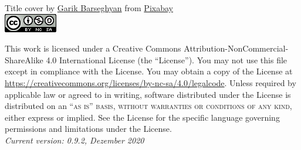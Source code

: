\noindent Title cover by \href{https://pixabay.com/users/insspirito-1851261/?utm_source=link-attribution&amp;utm_medium=referral&amp;utm_campaign=image&amp;utm_content=1280089}{Garik Barseghyan} from \href{https://pixabay.com/?utm_source=link-attribution&amp;utm_medium=referral&amp;utm_campaign=image&amp;utm_content=1280089}{Pixabay}\\

\includegraphics[]{figures/index/license.png}

\noindent This work is licensed under a Creative Commons Attribution-NonCommercial-ShareAlike 4.0 International License (the ``License''). You may not use this file except in compliance with the License. You may obtain a copy of the License at \url{https://creativecommons.org/licenses/by-nc-sa/4.0/legalcode}. Unless required by applicable law or agreed to in writing, software distributed under the License is distributed on an \textsc{``as is'' basis, without warranties or conditions of any kind}, either express or implied. See the License for the specific language governing permissions and limitations under the License.\\ %

\noindent \textit{Current version: 0.9.2, Dezember 2020} %
\newpage
{}
